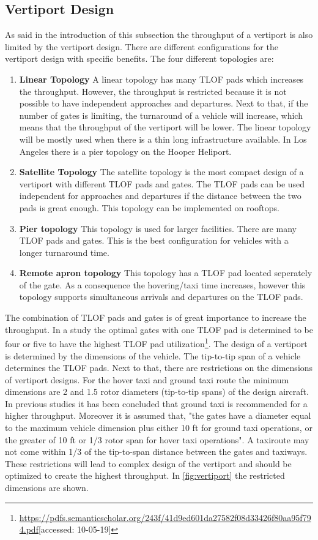 \subsection{Vertiport Design} \label{subsec:vportDesign}
As said in the introduction of this subsection the throughput of a vertiport is also limited by the vertiport design. There are different configurations for the vertiport design with specific benefits. The four different topologies are:
\begin{enumerate}
    \item \textbf{Linear Topology} A linear topology has many TLOF pads which increases the throughput. However, the throughput is restricted because it is not possible to have independent approaches and departures. Next to that, if the number of gates is limiting, the turnaround of a vehicle will increase, which means that the throughput of the vertiport will be lower. The linear topology will be mostly used when there is a thin long infrastructure available. In Los Angeles there is a pier topology on the Hooper Heliport.
    \item \textbf{Satellite Topology} The satellite topology is the most compact design of a vertiport with different TLOF pads and gates. The TLOF pads can be used independent for approaches and departures if the distance between the two pads is great enough. This topology can be implemented on rooftops.
    \item  \textbf{Pier topology} This topology is used for larger facilities. There are many TLOF pads and gates. This is the best configuration for vehicles with a longer turnaround time.
    \item \textbf{Remote apron topology} This topology has a TLOF pad located seperately of the gate. As a consequence the hovering/taxi time increases, however this topology supports simultaneous arrivals and departures on the TLOF pads.
\end{enumerate}
The combination of TLOF pads and gates is of great importance to increase the throughput. In a study the optimal gates with one TLOF pad is determined to be four or five to have the highest TLOF pad utilization\footnote{\url{https://pdfs.semanticscholar.org/243f/41d9ed601da27582f08d33426f80aa95f794.pdf}[accessed: 10-05-19]}. The design of a vertiport is determined by the dimensions of the vehicle. The tip-to-tip span of a vehicle determines the TLOF pads. Next to that, there are restrictions on the dimensions of vertiport designs. For the hover taxi and ground taxi route the minimum dimensions are 2 and 1.5 rotor diameters (tip-to-tip spans) of the design aircraft. In previous studies it has been concluded that ground taxi is recommended for a higher throughput. Moreover it is assumed that, "the gates have a diameter equal to the maximum vehicle dimension plus either 10 ft for ground taxi operations, or the greater of 10 ft or 1/3 rotor span for hover taxi operations"\footnotemark[\value{footnote}]. A taxiroute may not come within 1/3 of the tip-to-span distance between the gates and taxiways. These restrictions will lead to complex design of the vertiport and should be optimized to create the highest throughput. In \autoref{fig:vertiport} the restricted dimensions are shown.

